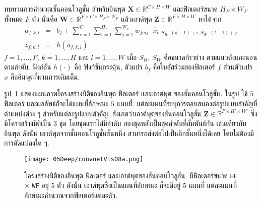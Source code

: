 ทบทวนการคำนวณชั้นคอนโวลูชั่น
สำหรับอินพุต
$\bm{X} \in \mathbb{R}^{C \times H \times W}$ 
และฟิลเตอร์ขนาด $H_F \times W_F$ ทั้งหมด $F$ ตัว
นั่นคือ $\bm{W} \in \mathbb{R}^{F \times C \times H_F \times W_F}$
แล้วเอาต์พุต $\bm{Z} \in \mathbb{R}^{F \times H \times W}$ หาได้จาก
\begin{eqnarray}
a_{f,k,l} &=& b_f + \sum_{c=1}^C \sum_{i=1}^{H_F} \sum_{j=1}^{W_F} w_{fcij} \cdot \hat{x}_{c, S_H \cdot (k-1)+i, S_W \cdot (l-1)+j} 
\label{eq: deep conv conv FxCxHxW} \\
z_{f,k,l} &=& h(a_{f,k,l})
\label{eq: deep conv 2Dconv Output}
\end{eqnarray}
$f = 1, \ldots, F$,
$k = 1, \ldots, H$ และ
$l = 1, \ldots, W$
เมื่อ 
$S_H$, $S_W$ คือขนาดก้าวย่าง ตามแนวตั้งและนอน ตามลำดับ.
ฟังก์ชัน $h(\cdot)$ คือ ฟังก์ชันกระตุ้น,
ตัวแปร $b_f$ คือไบอัสร่วมของฟิลเตอร์ $f$ %
ส่วนตัวแปร 
$\hat{x}$ คืออินพุตที่ผ่านการเติมเต็ม.

รูป~\ref{fig: deep convolution input filter 5x3xHxW output} แสดงแผนภาพโครงสร้างมิติของอินพุต ฟิลเตอร์ และเอาต์พุต ของชั้นคอนโวลูชั่น.
ในรูป ใช้ $5$ ฟิลเตอร์ และผลลัพธ์ก็จะได้แผนที่ลักษณะ $5$ แผนที่.
แต่ละแผนที่ระบุการตอบสนองต่อรูปแบบสำคัญที่ตำแหน่งต่าง ๆ สำหรับแต่ละรูปแบบสำคัญ.
สังเกตว่าเอาต์พุตของชั้นคอนโวลูชั่น $\bm{Z} \in \mathbb{R}^{F \times H' \times W'}$ ซึ่งมีโครงสร้างมิติเป็น $3$ ชุด โดยชุดแรกไม่มีลำดับ สองชุดหลังเป็นชุดลำดับที่สัมพันธ์กัน เช่นเดียวกับอินพุต
ดังนั้น เอาต์พุตจากชั้นคอนโวลูชั่นชั้นหนึ่ง สามารถส่งต่อไปเป็นอีกชั้นหนึ่งได้เลย โดยไม่ต้องมีการดัดแปลงใด ๆ.

%
\begin{figure}
	\begin{center}
		\texttt{[image: 05Deep/convnetVis08a.png]}
		\caption[โครงสร้างมิติ]{โครงสร้างมิติของอินพุต ฟิลเตอร์ และเอาต์พุตของชั้นคอนโวลูชั่น.
			มีฟิลเตอร์ขนาด \texttt{HF} $\times$ \texttt{WF} อยู่ $5$ ตัว
			ดังนั้น เอาต์พุตซึ่งเป็นแผนที่ลักษณะ ก็จะมีอยู่ $5$ แผนที่
			แต่ละแผนที่ลักษณะคำนวณจากฟิลเตอร์แต่ละตัว. 
		}
		\label{fig: deep convolution input filter 5x3xHxW output}
	\end{center}
\end{figure}
%

